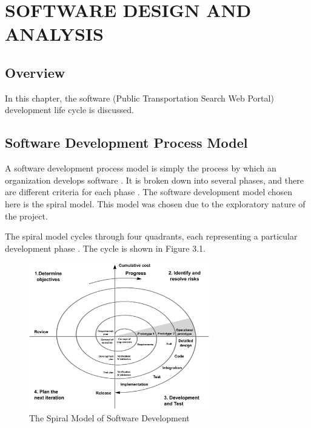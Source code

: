 
\chapter{SOFTWARE DESIGN AND ANALYSIS} %



\ifpdf
    \graphicspath{{3/figures/PNG/}{3/figures/PDF/}{3/figures/}}
\else
    \graphicspath{{3/figures/EPS/}{3/figures/}}
\fi

\section{Overview}
In this chapter, the software (Public Transportation Search Web Portal) development life cycle is discussed.

\section{Software Development Process Model}
A software development process model is simply the process by which an organization 
develops software \citep{mayo_software_2016}. It is broken down into several phases, and there are different criteria for each phase \citep{marciniak1994encyclopedia}. The software development model chosen here is the spiral model. This model was chosen due to the exploratory nature of the project.

The spiral model cycles through four quadrants, each representing a particular development phase \citep{boehm_spiral_1988}. The cycle is shown in Figure 3.1.

\begin{figure}[th!]
	\centering
	\includegraphics[width=0.7\textwidth]{spiral}
	\caption[The Spiral Model of Software Development]{The Spiral Model of Software Development \citep{boehm_spiral_1988}}
	\label{fig:spiral}
\end{figure}

